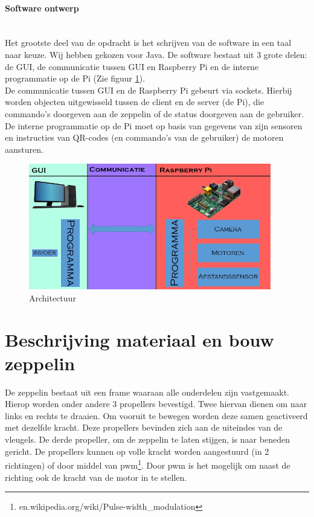 \documentclass[eind]{penoverslag}
\begin{document}
\paragraph{Software ontwerp}
~\\
Het grootste deel van de opdracht is het schrijven van de software in een taal naar keuze. Wij hebben gekozen voor Java. De software bestaat uit 3 grote delen: de GUI, de communicatie tussen GUI en Raspberry Pi en de interne programmatie op de Pi (Zie figuur \ref{schema}). \\
De communicatie tussen GUI en de Raspberry Pi gebeurt via sockets. Hierbij worden objecten uitgewisseld tussen de client en de server (de Pi), die commando's doorgeven aan de zeppelin of de status doorgeven aan de gebruiker. De interne programmatie op de Pi moet op basis van gegevens van zijn sensoren en instructies van QR-codes (en commando's van de gebruiker) de motoren aansturen. 

\begin{figure}[ht!]
\centering
\includegraphics[height=55mm]{Schema.jpg}
\caption{Architectuur}
\label{schema}
\end{figure}


\section{Beschrijving materiaal en bouw zeppelin}
De zeppelin bestaat uit een frame waaraan alle onderdelen zijn vastgemaakt. Hierop worden onder andere 3 propellers bevestigd. Twee hiervan dienen om naar links en rechts te draaien. Om vooruit te bewegen worden deze samen geactiveerd met dezelfde kracht. Deze propellers bevinden zich aan de uiteindes van de vleugels. De derde propeller, om de zeppelin te laten stijgen, is naar beneden gericht. De propellers kunnen op volle kracht worden aangestuurd (in 2 richtingen) of door middel van pwm\footnote{en.wikipedia.org/wiki/Pulse-width\_modulation}. Door pwm is het mogelijk om naast de richting ook de kracht van de motor in te stellen.~\\
\end{document}
